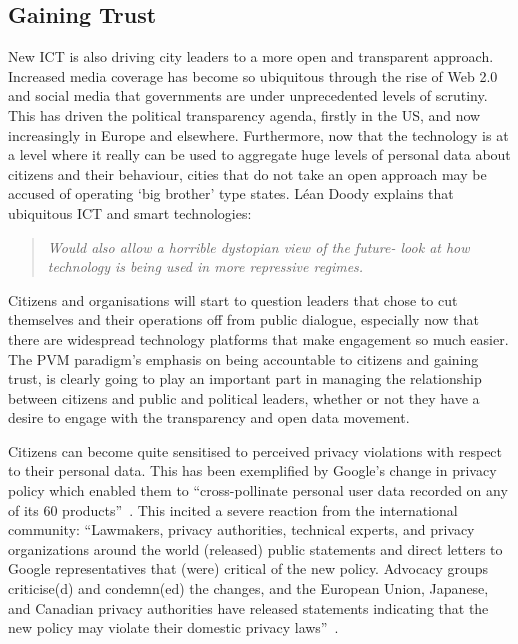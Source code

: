\documentclass[conference]{IEEEtran}
\begin{document}
\subsection{Gaining Trust}\label{sec:gaintrust}
New ICT is also driving city leaders to a more open and transparent
approach. Increased media coverage has become so ubiquitous through
the rise of Web 2.0 and social media that governments are under
unprecedented levels of scrutiny. This has driven the political
transparency agenda, firstly in the US, and now increasingly in Europe
and elsewhere. Furthermore, now that the technology is at a level
where it really can be used to aggregate huge levels of personal data
about citizens and their behaviour, cities that do not take an open
approach may be accused of operating `big brother' type states. L\'{e}an
Doody explains that ubiquitous ICT and smart technologies:

\begin{quote}
{\emph{Would also allow a horrible dystopian view of the future- look
    at how technology is being used in more repressive regimes.}}~\cite{doody:2012}
\end{quote}

Citizens and organisations will start to question leaders that chose
to cut themselves and their operations off from public dialogue,
especially now that there are widespread technology platforms that
make engagement so much easier. The PVM paradigm's emphasis on being
accountable to citizens and gaining trust, is clearly going to play an
important part in managing the relationship between citizens and
public and political leaders, whether or not they have a desire to
engage with the transparency and open data movement.

Citizens can become quite sensitised to perceived privacy violations
with respect to their personal data. This has been exemplified by
Google's change in privacy policy which enabled them to
``cross-pollinate personal user data recorded on any of its 60
products''~\cite{pinterkrainer:2012}. This incited a severe reaction from the international
community: ``Lawmakers, privacy authorities, technical experts, and
privacy organizations around the world (released) public statements
and direct letters to Google representatives that (were) critical of
the new policy. Advocacy groups criticise(d) and condemn(ed) the
changes, and the European Union, Japanese, and Canadian privacy
authorities have released statements indicating that the new policy
may violate their domestic privacy laws''~\cite{sutton:2012}.
\end{document}
